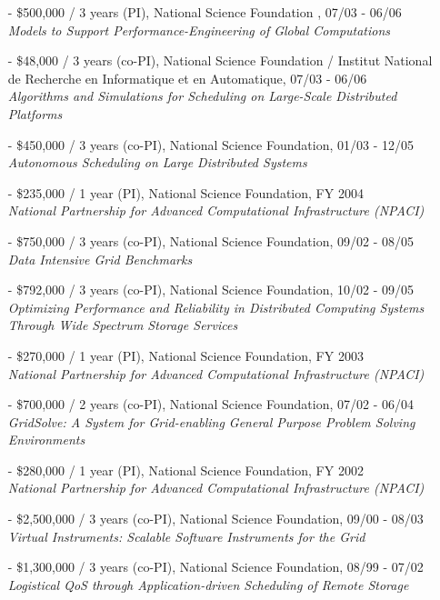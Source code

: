 \documentclass[times,11pt]{letter}
\begin{document}
\begin{itemize}
\item[-] \$500,000 / 3 years (PI), National Science Foundation , 07/03 - 06/06~\\
	{\it Models to Support Performance-Engineering of Global Computations}

\item[-] \$48,000 / 3 years (co-PI), National Science Foundation / Institut National de Recherche en Informatique et en Automatique, 07/03 - 06/06~\\
	{\it Algorithms and Simulations for Scheduling on Large-Scale Distributed Platforms}


\item[-] \$450,000 / 3 years (co-PI), National Science Foundation, 01/03 - 12/05~\\
	{\it Autonomous Scheduling on Large Distributed Systems}

\item[-] \$235,000 / 1 year (PI), National Science Foundation, FY 2004~\\
      \emph{National Partnership for Advanced Computational Infrastructure (NPACI)}


\item[-] \$750,000 / 3 years (co-PI), National Science Foundation, 09/02 - 08/05~\\
	{\it Data Intensive Grid Benchmarks}

\item[-] \$792,000 / 3 years (co-PI), National Science Foundation, 10/02 - 09/05~\\  
      {\it Optimizing Performance and Reliability in Distributed Computing Systems 
       Through Wide Spectrum Storage Services}

\item[-] \$270,000 / 1 year (PI), National Science Foundation, FY 2003~\\
      \emph{National Partnership for Advanced Computational Infrastructure (NPACI)}


\item[-] \$700,000 / 2 years (co-PI), National Science Foundation, 07/02 - 06/04~\\
      {\it GridSolve:  A System for Grid-enabling General Purpose Problem Solving Environments}

\item[-] \$280,000 / 1 year (PI), National Science Foundation, FY 2002~\\
      \emph{National Partnership for Advanced Computational Infrastructure (NPACI)}

\item[-] \$2,500,000 / 3 years (co-PI), National Science Foundation, 09/00 - 08/03~\\
{\it Virtual Instruments: Scalable Software Instruments for the Grid}

\item[-] \$1,300,000 / 3 years (co-PI), National Science Foundation, 08/99 - 07/02~\\
{\it Logistical QoS through Application-driven Scheduling of Remote Storage}

\end{itemize}
\end{document}
